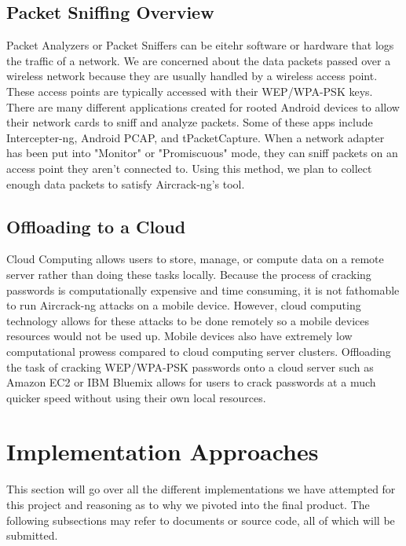 \documentclass[12pt, titlepage]{article}
\begin{document}
\subsection{Packet Sniffing Overview}
Packet Analyzers or Packet Sniffers can be eitehr software or hardware that logs the traffic of a network. We are concerned about the data packets passed over a wireless network because they are usually handled by a wireless access point. These access points are typically accessed with their WEP/WPA-PSK keys. There are many different applications created for rooted Android devices to allow their network cards to sniff and analyze packets. Some of these apps include Intercepter-ng, Android PCAP, and tPacketCapture. When a network adapter has been put into "Monitor" or "Promiscuous" mode, they can sniff packets on an access point they aren't connected to. Using this method, we plan to collect enough data packets to satisfy Aircrack-ng's tool.

\subsection{Offloading to a Cloud}
Cloud Computing allows users to store, manage, or compute data on a remote server rather than doing these tasks locally. Because the process of cracking passwords is computationally expensive and time consuming, it is not fathomable to run Aircrack-ng attacks on a mobile device. However, cloud computing technology allows for these attacks to be done remotely so a mobile devices resources would not be used up. Mobile devices also have extremely low computational prowess compared to cloud computing server clusters. Offloading the task of cracking WEP/WPA-PSK passwords onto a cloud server such as Amazon EC2 or IBM Bluemix allows for users to crack passwords at a much quicker speed without using their own local resources.

\section{Implementation Approaches}
This section will go over all the different implementations we have attempted for this project and reasoning as to why we pivoted into the final product. The following subsections may refer to documents or source code, all of which will be submitted. 
\end{document}
